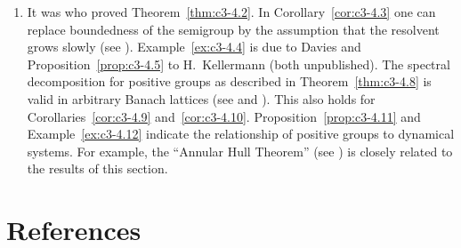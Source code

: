 \begin{enumerate}[label=\emph{Section 3.\arabic*:}, wide, itemsep=1ex]
\item 
It was \textcite{derndinger:1980} who proved Theorem~\ref{thm:c3-4.2}. 
In Corollary~\ref{cor:c3-4.3} one can replace boundedness of the semigroup by the assumption that the resolvent grows slowly (see \textcite{greiner:1982}). 
Example~\ref{ex:c3-4.4} is due to Davies and Proposition~\ref{prop:c3-4.5} to H.~Kellermann (both unpublished). 
The spectral decomposition for positive groups as described in Theorem~\ref{thm:c3-4.8} is valid in arbitrary Banach lattices (see \textcite{arendt:1982} and \textcite{greiner:1984c}). 
This also holds for Corollaries~\ref{cor:c3-4.9} and~\ref{cor:c3-4.10}. 
Proposition~\ref{prop:c3-4.11} and Example~\ref{ex:c3-4.12} indicate the relationship of positive groups to dynamical systems. 
For example, the \enquote{Annular Hull Theorem} (see \textcite{chiconeswanson:1981}) is closely related to the results of this section.
\end{enumerate}
\section*{References}
{\RaggedRight
  \printbibliography[heading=none]
 }